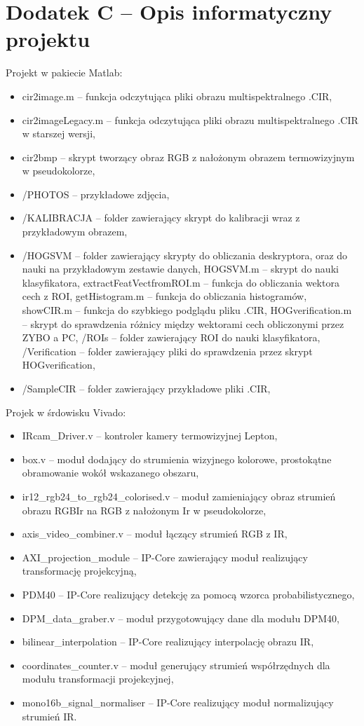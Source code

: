 \chapter{Dodatek C -- Opis informatyczny projektu}

Projekt w pakiecie Matlab:
\begin{itemize}
\item cir2image.m -- funkcja odczytująca pliki obrazu multispektralnego .CIR,
\item cir2imageLegacy.m -- funkcja odczytująca pliki obrazu multispektralnego .CIR w starszej wersji,
\item cir2bmp -- skrypt tworzący obraz RGB z nałożonym obrazem termowizyjnym w pseudokolorze,
\item /PHOTOS -- przykładowe zdjęcia,
\item /KALIBRACJA -- folder zawierający skrypt do kalibracji wraz z przykładowym obrazem,
\item /HOGSVM -- folder zawierający skrypty do obliczania deskryptora, oraz do nauki na przykładowym zestawie danych,
\subitem HOGSVM.m -- skrypt do nauki klasyfikatora,
\subitem extractFeatVectfromROI.m -- funkcja do obliczania wektora cech z ROI,
\subitem getHistogram.m -- funkcja do obliczania histogramów,
\subitem showCIR.m -- funkcja do szybkiego podglądu pliku .CIR,
\subitem HOGverification.m -- skrypt do sprawdzenia różnicy między wektorami cech obliczonymi przez ZYBO a PC,
\subitem /ROIs -- folder zawierający ROI do nauki klasyfikatora,
\subitem /Verification -- folder zawierający pliki do sprawdzenia przez skrypt HOGverification,
\item /SampleCIR -- folder zawierający przykładowe pliki .CIR,
\end{itemize}

Projek w śrdowisku Vivado:
\begin{itemize}
\item IRcam\_Driver.v -- kontroler kamery termowizyjnej Lepton,
\item box.v -- moduł dodający do strumienia wizyjnego kolorowe, prostokątne obramowanie wokół wskazanego obszaru,
\item ir12\_rgb24\_to\_rgb24\_colorised.v -- moduł zamieniający obraz strumień obrazu RGBIr na RGB z nałożonym Ir w pseudokolorze,
\item axis\_video\_combiner.v -- moduł łączący strumień RGB z IR,
\item AXI\_projection\_module -- IP-Core zawierający moduł realizujący transformację projekcyjną,
\item PDM40 -- IP-Core realizujący detekcję za pomocą wzorca probabilistycznego,
\item DPM\_data\_graber.v -- moduł przygotowujący dane dla modułu DPM40,
\item bilinear\_interpolation -- IP-Core realizujący interpolację obrazu IR,
\item coordinates\_counter.v -- moduł generujący strumień współrzędnych dla modułu transformacji projekcyjnej,
\item mono16b\_signal\_normaliser -- IP-Core realizujący moduł normalizujący strumień IR.
\end{itemize}